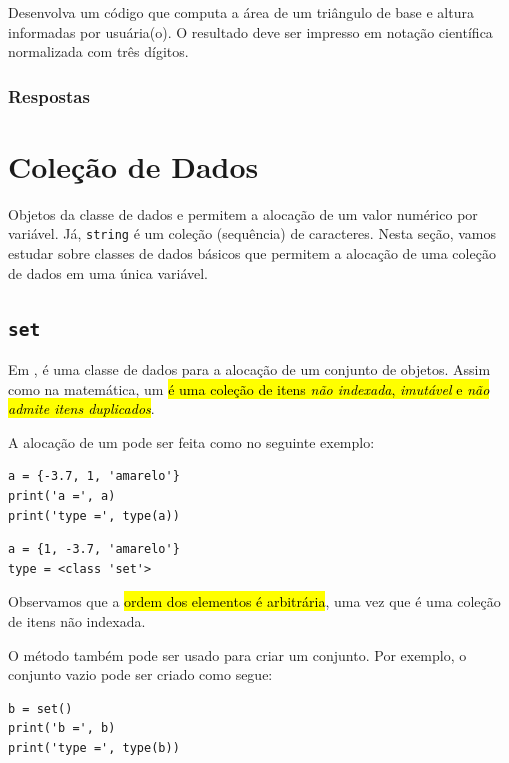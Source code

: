 \begin{exer}
  Desenvolva um código que computa a área de um triângulo de base e altura informadas por usuária(o). O resultado deve ser impresso em notação científica normalizada com três dígitos.
\end{exer}

\ifisbook
\subsubsection{Respostas}
\shipoutAnswer
\fi

\section{Coleção de Dados}\label{cap_lingua_sec_colecao}

Objetos da classe de dados {\PYTHONint} e {\PYTHONfloat} permitem a alocação de um valor numérico por variável. Já, \texttt{string} é um coleção (sequência) de caracteres. Nesta seção, vamos estudar sobre classes de dados básicos que permitem a alocação de uma coleção de dados em uma única variável.

\subsection{\texttt{set}}

Em {\python}, {\PYTHONset} é uma classe de dados para a alocação de um conjunto de objetos. Assim como na matemática, um \hl{{\PYTHONset} é uma coleção de itens \emph{não indexada}, \emph{imutável} e \emph{não admite itens duplicados}}.

A alocação de um {\PYTHONset} pode ser feita como no seguinte exemplo:

\begin{lstlisting}
a = {-3.7, 1, 'amarelo'}
print('a =', a)
print('type =', type(a))
\end{lstlisting}

\begin{verbatim}
a = {1, -3.7, 'amarelo'}
type = <class 'set'>
\end{verbatim}

Observamos que a \hl{ordem dos elementos é arbitrária}, uma vez que {\PYTHONset} é uma coleção de itens não indexada.

O método {\PYTHONsetMethod} também pode ser usado para criar um conjunto. Por exemplo, o conjunto vazio pode ser criado como segue:

\begin{lstlisting}
b = set()
print('b =', b)
print('type =', type(b))
\end{lstlisting}

